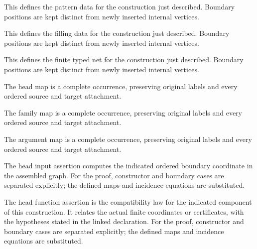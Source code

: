 This defines the pattern data for the construction just described. Boundary positions are kept distinct from newly inserted internal vertices.
\par{}

This defines the filling data for the construction just described. Boundary positions are kept distinct from newly inserted internal vertices.
\par{}

This defines the finite typed net for the construction just described. Boundary positions are kept distinct from newly inserted internal vertices.
\par{}

The head map is a complete occurrence, preserving original labels and every ordered source and target attachment.
\par{}

The family map is a complete occurrence, preserving original labels and every ordered source and target attachment.
\par{}

The argument map is a complete occurrence, preserving original labels and every ordered source and target attachment.
\par{}

The head input assertion computes the indicated ordered boundary coordinate in the assembled graph.
For the proof, constructor and boundary cases are separated explicitly; the defined maps and incidence equations are substituted.
\par{}

The head function assertion is the compatibility law for the indicated component of this construction. It relates the actual finite coordinates or certificates, with the hypotheses stated in the linked declaration.
For the proof, constructor and boundary cases are separated explicitly; the defined maps and incidence equations are substituted.
\par{}

